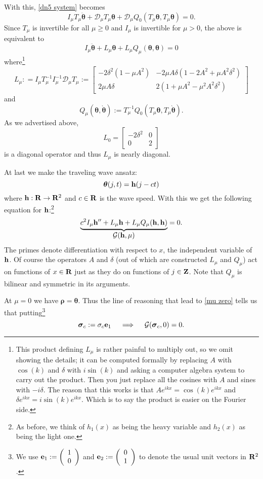 \documentclass[12pt]{amsart}
\makeatletter
\numberwithin{equation}{section}
\newcommand{\be}{\begin{equation}}
\newcommand{\ee}{\end{equation}}
\newcommand{\bes}{\begin{equation*}}
\newcommand{\ees}{\end{equation*}}
\newcommand{\R}{{\bf{R}}}
\newcommand{\Z}{{\bf{Z}}}
\newcommand{\hb}{{\bf{h}}}
\newcommand{\jb}{{{\bf{e}}_2}}
\newcommand{\ib}{{{\bf{e}}_1}}
\newcommand{\G}{{\mathcal{G}}}
\newcommand{\D}{{\mathcal{D}}}
\newcommand{\sigmab}{{\boldsymbol \sigma}}
\newcommand{\rhob}{{\boldsymbol \rho}}
\newcommand{\thetab}{{\boldsymbol \theta}}
\newcommand{\bunderbrace}[2]{%
  \begin{array}[t]{@{}c@{}}
  \underbrace{#1}\\
  #2
  \end{array}
}
\makeatother
\begin{document}
With this, \eqref{dn5 system} becomes
\bes
 I_\mu T_\mu \ddot \thetab + \D_\mu T_\mu \thetab + \D_\mu Q_0(T_\mu \thetab,T_\mu \thetab) = 0.
\ees
Since $T_\mu$ is invertible for all $\mu \ge 0$ and $I_\mu$ is invertible for $\mu >0$,
the above is equivalent to
\be\label{dn6}
I_\mu \ddot \thetab + L_\mu  \thetab +L_\mu   Q_\mu (\thetab, \thetab) = 0
\ee
where\footnote{This product defining $L_\mu$ is rather painful to multiply out, so we omit showing the details; it can be computed formally by replacing $A$ with $\cos(k)$ and $\delta$ with $i \sin(k)$ and asking a computer algebra
system to carry out the product. Then you just replace all the cosines with $A$ and sines with $-i \delta$.
The reason that this works is that $A e^{ikx} = \cos(k) e^{ikx}$ and $\delta e^{ikx} = i \sin(k) e^{ikx}$. Which is to
say the product is easier on the Fourier side.} 
\be\label{Lm}
L_\mu : = I_\mu T_\mu^{-1} I_\mu^{-1}\D_\mu T_\mu := \left[ 
\begin{array}{cc}
 -2 \delta^2 (1-\mu A^2) & -2 \mu A \delta \left(1-2A^2+\mu A^2 \delta^2 \right)\\
 2 \mu A \delta & 2(1 +  \mu A^2 -  \mu^2 A^2 \delta^2)
\end{array}
\right]
\ee
and
$$
Q_\mu(\thetab,\grave{\thetab}) := T^{-1}_\mu Q_0(T_\mu \thetab,T_\mu \grave{\thetab}). 
$$
As we advertised above,  $$
L_0 =\left[\begin{array}{cc} -2 \delta^2 & 0 \\ 0 & 2 \end{array}\right]$$
is a diagonal operator and thus $L_\mu$ is nearly diagonal. 





At last we make the traveling wave ansatz:
$$
\thetab(j,t) = \hb(j-ct)
$$
where $\hb:\R \to \R^2$ and $c \in \R$ is the wave speed.
With this we get the following equation for $\hb$:\footnote{As before, we think of $h_1(x)$ as being the heavy variable and $h_2(x)$ as being the light one.} 
\be\label{TWE5}
 \bunderbrace{c^2 I_\mu \hb'' + L_\mu  \hb +L_\mu   Q_\mu (\hb, \hb)}{\G(\hb,\mu) }= 0.
\ee
The primes denote differentiation with respect to $x$, the independent variable of $\hb$.
Of course the operators $A$ and $\delta$ (out of which are constructed $L_\mu$ and $Q_\mu$) act on functions of $x\in\R$ just as they do on functions of $j \in \Z$. 
Note that $Q_\mu$ is bilinear and symmetric in its arguments.

At 
$\mu =0$ we have $\rhob = \thetab$. Thus the line of reasoning that lead to \eqref{mu zero} tells us  that putting\footnote{We use $\ib:=\left(\begin{array}{c}1\\0 \end{array} \right)$ and $\jb:=\left(\begin{array}{c}0\\1 \end{array} \right)$ to denote the usual unit vectors in $\R^2$.}
\be\label{what sigma does}
\sigmab_c := \sigma_c \ib 
\quad \implies \quad
\G(\sigmab_c,0) = 0.
\ee
\end{document}

